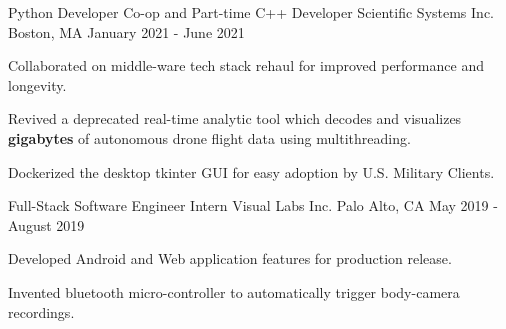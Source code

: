 \begin{cventries}
  \cventry
    {Python Developer Co-op and Part-time C++ Developer} %
    {Scientific Systems Inc.} %
    {Boston, MA} %
    {January 2021 - June 2021} %
    {
      \begin{cvitems} %
        \item {Collaborated on middle-ware tech stack rehaul for improved performance and longevity.}
         \item {Revived a deprecated real-time analytic tool which decodes and visualizes \textbf{gigabytes} of autonomous drone flight data using multithreading.}
        \item {Dockerized the desktop tkinter GUI for easy adoption by U.S. Military Clients.}
      \end{cvitems}
    }
  \cventry
    {Full-Stack Software Engineer Intern} %
    {Visual Labs Inc.} %
    {Palo Alto, CA} %
    {May 2019 - August 2019} %
    {
      \begin{cvitems} %
        \item {Developed Android and Web application features for production release.}
        \item {Invented bluetooth micro-controller to automatically trigger body-camera recordings.}
      \end{cvitems}
    }

\end{cventries}
